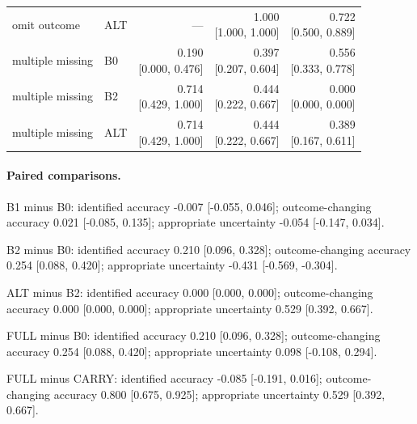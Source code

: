 \begin{table}[t]
\begin{tabular}{llrrr}
omit outcome & ALT & --- & \shortstack{1.000\\{[1.000, 1.000]}} & \shortstack{0.722\\{[0.500, 0.889]}}\\

multiple missing & B0 & \shortstack{0.190\\{[0.000, 0.476]}} & \shortstack{0.397\\{[0.207, 0.604]}} & \shortstack{0.556\\{[0.333, 0.778]}}\\

multiple missing & B2 & \shortstack{0.714\\{[0.429, 1.000]}} & \shortstack{0.444\\{[0.222, 0.667]}} & \shortstack{0.000\\{[0.000, 0.000]}}\\

multiple missing & ALT & \shortstack{0.714\\{[0.429, 1.000]}} & \shortstack{0.444\\{[0.222, 0.667]}} & \shortstack{0.389\\{[0.167, 0.611]}}\\

\bottomrule\end{tabular}\end{table}

\paragraph{Paired comparisons.}

B1 minus B0: identified accuracy -0.007 [-0.055, 0.046]; outcome-changing accuracy 0.021 [-0.085, 0.135]; appropriate uncertainty -0.054 [-0.147, 0.034].

B2 minus B0: identified accuracy 0.210 [0.096, 0.328]; outcome-changing accuracy 0.254 [0.088, 0.420]; appropriate uncertainty -0.431 [-0.569, -0.304].

ALT minus B2: identified accuracy 0.000 [0.000, 0.000]; outcome-changing accuracy 0.000 [0.000, 0.000]; appropriate uncertainty 0.529 [0.392, 0.667].

FULL minus B0: identified accuracy 0.210 [0.096, 0.328]; outcome-changing accuracy 0.254 [0.088, 0.420]; appropriate uncertainty 0.098 [-0.108, 0.294].

FULL minus CARRY: identified accuracy -0.085 [-0.191, 0.016]; outcome-changing accuracy 0.800 [0.675, 0.925]; appropriate uncertainty 0.529 [0.392, 0.667].

